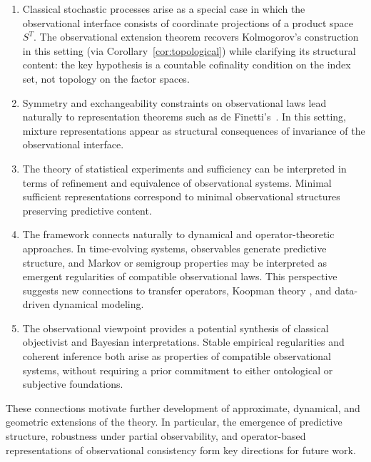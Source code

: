 \begin{enumerate}
	\item Classical stochastic processes arise as a special case in which the observational interface consists of coordinate projections of a product space $S^T$.  The observational extension theorem recovers Kolmogorov’s construction in this setting (via Corollary~\ref{cor:topological}) while clarifying its structural content: the key hypothesis is a countable cofinality condition on the index set, not topology on the factor spaces.

	\item Symmetry and exchangeability constraints on observational laws lead naturally to representation theorems such as de Finetti’s~\cite{deFinetti}. In this setting, mixture representations appear as structural consequences of invariance of the observational interface.

	\item The theory of statistical experiments and sufficiency can be interpreted in terms of refinement and equivalence of observational systems. Minimal sufficient representations correspond to minimal observational structures preserving predictive content.

	\item The framework connects naturally to dynamical and operator-theoretic approaches. In time-evolving systems, observables generate predictive structure, and Markov or semigroup properties may be interpreted as emergent regularities of compatible observational laws. This perspective suggests new connections to transfer operators, Koopman theory \cite{Koopman1931,Mezic}, and data-driven dynamical modeling.

	\item The observational viewpoint provides a potential synthesis of classical objectivist and Bayesian interpretations. Stable empirical regularities and coherent inference both arise as properties of compatible observational systems, without requiring a prior commitment to either ontological or subjective foundations.
\end{enumerate}

These connections motivate further development of approximate, dynamical,
and geometric extensions of the theory. In particular, the emergence of
predictive structure, robustness under partial observability, and
operator-based representations of observational consistency form key
directions for future work.

